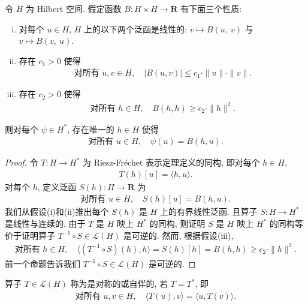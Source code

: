 \documentclass[../../main.tex]{subfiles}
\begin{document}
\begin{theorem}\label{theorem:ch16-lax-milgram}
令 $H$ 为 Hilbert 空间. 假定函数 $B:H\times H\to\mathbf{R}$ 有下面三个性质:
\begin{enumerate}[(i)]
\item 对每个 $u\in H$, $H$ 上的以下两个泛函是线性的: $v\mapsto B(u,\ v)$ 与 $v\mapsto B(v,\ u)$.
\item 存在 $c_{1}>0$ 使得
\begin{align*}
\text{对所有 }u,v\in H,\quad|B(u,v)|\leqslant c_{1}\cdot\|u\|\cdot\|v\|.
\end{align*}
\item 存在 $c_{2}>0$ 使得
\begin{align*}
\text{对所有 }h\in H,\quad B(h,h)\geqslant c_{2}\cdot\|h\|^{2}.
\end{align*}
\end{enumerate}
则对每个 $\psi\in H^{*}$, 存在唯一的 $h\in H$ 使得
\begin{align*}
\text{对所有 }u\in H,\quad\psi(u)=B(h,u).
\end{align*}
\end{theorem}

\begin{proof}
令 $T:H\to H^{*}$ 为 Riesz-Fr\'echet 表示定理定义的同构, 即对每个 $h\in H$,
\begin{align}
T(h)[u]=\langle h,u\rangle.\label{align:ch16-lax-1}
\end{align}
对每个 $h$, 定义泛函 $S(h):H\to\mathbf{R}$ 为
\begin{align}
\text{对所有 }u\in H,\quad S(h)[u]=B(h,u).\label{align:ch16-lax-2}
\end{align}
我们从假设(i)和(ii)推出每个 $S(h)$ 是 $H$ 上的有界线性泛函. 且算子 $S:H\to H^{*}$ 是线性与连续的. 由于 $T$ 是 $H$ 映上 $H^{*}$ 的同构, 则证明 $S$ 是 $H$ 映上 $H^{*}$ 的同构等价于证明算子 $T^{-1}\circ S\in\mathcal{L}(H)$ 是可逆的. 然而, 根据假设(iii),
\begin{align*}
\text{对所有 }h\in H,\quad\langle(T^{-1}\circ S)(h),h\rangle=S(h)[h]=B(h,h)\geqslant c_{2}\cdot\|h\|^{2}.
\end{align*}
前一个命题告诉我们 $T^{-1}\circ S\in\mathcal{L}(H)$ 是可逆的.
\end{proof}

\begin{definition}[对称/自伴算子]\label{definition:ch16-symmetric}
算子 $T\in\mathcal{L}(H)$ 称为是对称的或自伴的, 若 $T=T^{*}$, 即
\begin{align*}
\text{对所有 }u,v\in H,\quad\langle T(u),v\rangle=\langle u,T(v)\rangle.
\end{align*}
\end{definition}
\end{document}
